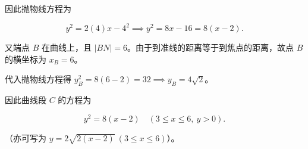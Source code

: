 \begin{answer}
因此抛物线方程为

\nopagebreak[4]
\[
y^2 = 2(4)x - 4^2 \implies y^2 = 8x - 16 = 8(x-2).
\]

又端点 $B$ 在曲线上，且 $|BN|=6$。由于到准线的距离等于到焦点的距离，故点 $B$ 的横坐标为 $x_B = 6$。

代入抛物线方程得 $y_B^2 = 8(6-2) = 32 \implies y_B = 4\sqrt2$。

因此曲线段 $C$ 的方程为

\nopagebreak[4]
\[
y^2 = 8(x-2)\quad (3 \le x \le 6,\ y > 0).
\]

（亦可写为 $y = 2\sqrt{2(x-2)}\ (3 \le x \le 6)$）。


\end{answer}
